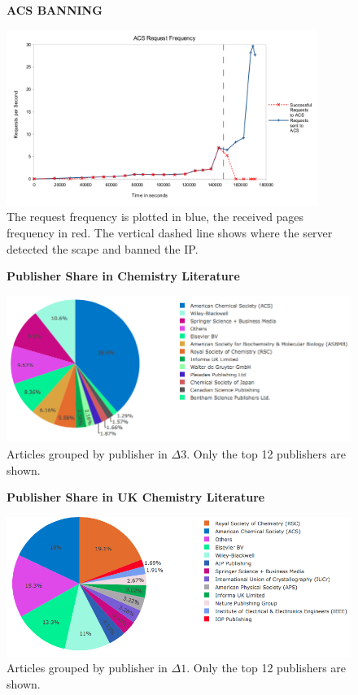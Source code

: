 \begin{figure}[H]
    \centering
    \textbf{ACS BANNING}\par\medskip
    \includegraphics[width=0.9\textwidth]{Data_Acquisition/ACS_crash_line.png}
    \caption[Request Frequency Leading to ACS Ban]{The request frequency is plotted in blue, the received pages frequency in red. The vertical dashed line shows where the server detected the scape and banned the IP.}
     \label{fig:ACSBAN}
\end{figure}
\newpage
\addtocounter{page}{1}

\begin{figure}[H]
    \centering
    \textbf{Publisher Share in Chemistry Literature}\par\medskip
    \includegraphics[width=\textwidth]{Data_Acquisition/publishers_pie3.png}
    \caption[Publisher Share in Chemistry Literature]{Articles grouped by publisher in $\Delta3$. Only the top 12 publishers are shown.}
     \label{fig:PUBPI}
\end{figure}

\begin{figure}[H]
    \centering
    \textbf{Publisher Share in UK Chemistry Literature}\par\medskip
    \includegraphics[width=\textwidth]{Data_Acquisition/uk_publishers_pie2.png}
    \caption[Publisher Share in UK Chemistry Literature]{Articles grouped by publisher in $\Delta1$. Only the top 12 publishers are shown.}
     \label{fig:UKPUBPI}
\end{figure}
\newpage
